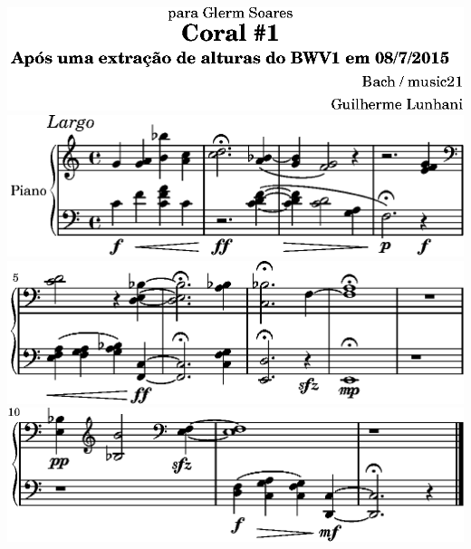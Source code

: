 \includegraphics{../examples/bwv1/d8/lily-ef199858-1}%
\ifx\betweenLilyPondSystem \undefined
  \linebreak
\else
  \expandafter{}%
\fi
\includegraphics{../examples/bwv1/d8/lily-ef199858-2}%
\ifx\betweenLilyPondSystem \undefined
  \linebreak
\else
  \expandafter{}%
\fi
\includegraphics{../examples/bwv1/d8/lily-ef199858-3}%
\ifx\betweenLilyPondSystem \undefined
  \linebreak
\else
  \expandafter{}%
\fi
\includegraphics{../examples/bwv1/d8/lily-ef199858-4}%
